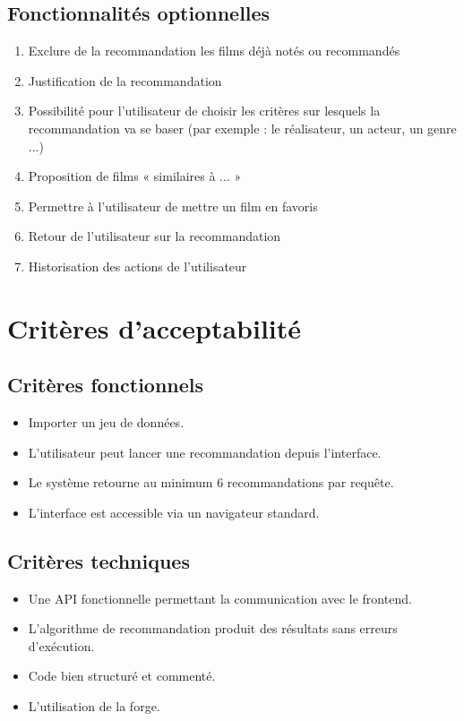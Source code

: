 \documentclass[a4paper,12pt]{report}
\begin{document}
\subsection{Fonctionnalités optionnelles}
\begin{enumerate}[label=OFR-0\arabic*, leftmargin=1.7cm]
    \item Exclure de la recommandation les films déjà notés ou recommandés
    \item Justification de la recommandation
    \item Possibilité pour l'utilisateur de choisir les critères sur lesquels la recommandation va se baser (par exemple : le réalisateur, un acteur, un genre ...)
    \item Proposition de films « similaires à ... »
    
    \item Permettre à l'utilisateur de mettre un film en favoris
    \item Retour de l'utilisateur sur la recommandation
    \item Historisation des actions de l'utilisateur

    
\end{enumerate}

\section{Critères d’acceptabilité}
\label{acceptabilité}
\subsection{Critères fonctionnels}
\begin{itemize}
\item Importer un jeu de données.
\item L’utilisateur peut lancer une recommandation depuis l’interface.
\item Le système retourne au minimum 6 recommandations par requête.
\item L’interface est accessible via un navigateur standard.
\end{itemize}
\subsection{Critères techniques}
\begin{itemize}
\item Une API fonctionnelle permettant la communication avec le frontend.
\item L’algorithme de recommandation produit des résultats sans erreurs d’exécution.
\item Code bien structuré et commenté.
\item L’utilisation de la forge.
\end{itemize}
\end{document}
